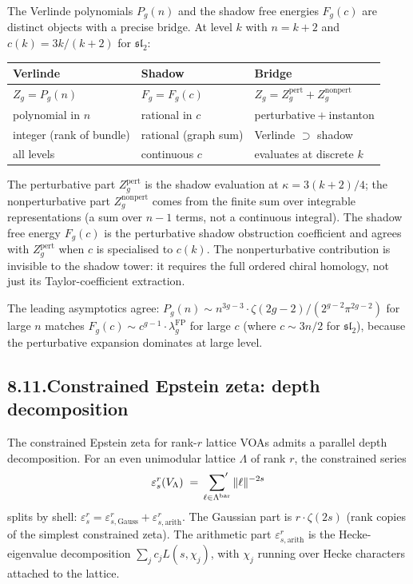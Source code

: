 \documentclass[11pt,reqno]{amsart}
\theoremstyle{definition}
\theoremstyle{remark}
\providecommand{\FP}{\mathrm{FP}}
\providecommand{\FP}{\mathrm{FP}}
\numberwithin{equation}{section}
\begin{document}
The Verlinde polynomials $P_g(n)$ and the shadow free energies
$F_g(c)$ are distinct objects with a precise bridge. At level
$k$ with $n = k + 2$ and $c(k) = 3k/(k+2)$ for
$\mathfrak{sl}_2$:
\begin{center}
\renewcommand{\arraystretch}{1.15}
\begin{tabular}{lll}
\textbf{Verlinde} & \textbf{Shadow} & \textbf{Bridge}\\ \hline
$Z_g = P_g(n)$ & $F_g = F_g(c)$ & $Z_g = Z_g^{\mathrm{pert}}
+ Z_g^{\mathrm{nonpert}}$\\
polynomial in $n$ & rational in $c$ & perturbative${}+{}$instanton\\
integer (rank of bundle) & rational (graph sum) & Verlinde
$\supset$ shadow\\
all levels & continuous $c$ & evaluates at discrete $k$\\
\end{tabular}
\end{center}
The perturbative part $Z_g^{\mathrm{pert}}$ is the shadow
evaluation at $\kappa = 3(k+2)/4$; the nonperturbative part
$Z_g^{\mathrm{nonpert}}$ comes from the finite sum over
integrable representations (a sum over $n - 1$ terms, not a
continuous integral). The shadow free energy $F_g(c)$ is the
perturbative shadow obstruction coefficient and agrees with
$Z_g^{\mathrm{pert}}$ when $c$ is specialised to $c(k)$. The
nonperturbative contribution is invisible to the shadow tower:
it requires the full ordered chiral homology, not just its
Taylor-coefficient extraction.

The leading asymptotics agree:
$P_g(n) \sim n^{3g-3} \cdot \zeta(2g-2)/(2^{g-2}\pi^{2g-2})$
for large $n$ matches
$F_g(c) \sim c^{g-1} \cdot \lambda_g^{\FP}$ for large $c$
(where $c \sim 3n/2$ for $\mathfrak{sl}_2$), because the
perturbative expansion dominates at large level.

\subsection*{8.11.\enspace Constrained Epstein zeta: depth decomposition}

The constrained Epstein zeta for rank-$r$ lattice VOAs admits a
parallel depth decomposition. For an even unimodular lattice
$\Lambda$ of rank $r$, the constrained series
\[
\varepsilon^r_s(V_\Lambda)
\;=\;
\sideset{}{'}\sum_{\ell \in \Lambda^{\mathrm{bar}}}
\|\ell\|^{-2s}
\]
splits by shell:
$\varepsilon^r_s = \varepsilon^r_{s,\mathrm{Gauss}}
+ \varepsilon^r_{s,\mathrm{arith}}$.
The Gaussian part is $r \cdot \zeta(2s)$ (rank copies of the
simplest constrained zeta). The arithmetic part
$\varepsilon^r_{s,\mathrm{arith}}$ is the Hecke-eigenvalue
decomposition
$\sum_j c_j L(s, \chi_j)$, with $\chi_j$ running over Hecke
characters attached to the lattice.
\end{document}
